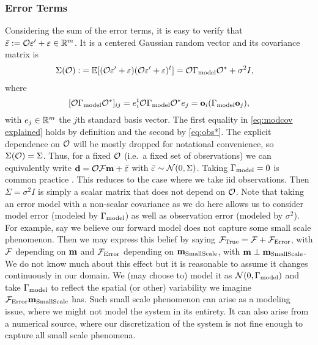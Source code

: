 \subsubsection{Error Terms}
Considering the sum of the error terms, it is easy to verify that
$\bar{\varepsilon} := \mathcal{O} \varepsilon' + \varepsilon \in \mathbb{R}^m$. It is a centered Gaussian
random vector and its covariance matrix is
\begin{align}\label{eq:Sigma}
  \begin{split}
    \Sigma(\obs) :&= \mathbb{E}[ (\obs \eps' + \eps)  (\obs \eps' + \eps)^t ] 
    = \obs \modcov \obs^* + \sigma^2I , 
  \end{split}
\end{align}
where
\begin{equation}\label{eq:modcov explained}
  [\obs \modcov \obs^*]_{ij} = e_i^t \obs \modcov \obs^* e_j = \meas_i (\modcov \meas_j),
\end{equation}
with $e_j \in \mathbb{R}^m$ the $j$th standard basis vector. The first
equality in \eqref{eq:modcov explained} holds by definition and the
second by \eqref{eq:obs*}. The explicit dependence on $\mathcal{O}$ will be
mostly dropped for notational convenience, so $\Sigma(\mathcal{O}) =
\Sigma$. Thus, for a fixed $\mathcal{O}$ (i.e.\ a fixed set of observations)
we can equivalently write $\mathbf{d} = \mathcal{O} \mathcal{F} \mathbf{m} + \bar{\varepsilon}$ with
$\bar{\varepsilon} \sim \mathcal{N}(0,\Sigma)$. Taking $\Gamma_{\textup{model}} = 0$ is common
practice \cite{Tarantola05,Kaipio2006,Vogel02}. This reduces to
the case where we take iid observations. Then $\Sigma = \sigma^2I$ is
simply a scalar matrix that does not depend on $\mathcal{O}$. Note that
taking an error model with a non-scalar covariance as we do here
allows us to consider model error (modeled by $\Gamma_{\textup{model}}$) as well as
observation error (modeled by $\sigma^2$). For example, say we believe
our forward model does not capture some small scale phenomenon.  Then
we may express this belief by saying $\mathcal{F}_{\textup{True}} = \mathcal{F} + \mathcal{F}_{\textup{Error}}$, with $\mathcal{F}$
depending on $\mathbf{m}$ and $\mathcal{F}_{\textup{Error}}$ depending on $\mathbf{m}_{\textup{SmallScale}}$, with $\mathbf{m}
\perp \mathbf{m}_{\textup{SmallScale}}$. We do not know much about this effect but it is
reasonable to assume it changes continuously in our domain. We (may
choose to) model it as $\mathcal{N} (0, \Gamma_{\textup{model}})$ and take $\Gamma_{\textup{model}}$ to
reflect the spatial (or other) variability we imagine $\mathcal{F}_{\textup{Error}} \mathbf{m}_{\textup{SmallScale}}$
has. Such small scale phenomenon can arise as a modeling issue, where
we might not model the system in its entirety. It can also arise from
a numerical source, where our discretization of the system is not fine
enough to capture all small scale phenomena.

